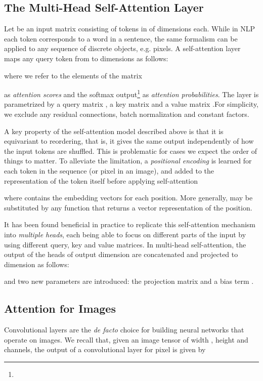 \documentclass{article} \usepackage{iclr2020_conference,times}
\begin{document}
\subsection{The Multi-Head Self-Attention Layer}
\label{ssec:background_self_attention}

Let  be an input matrix consisting of  tokens in of  dimensions each.
While in NLP each token corresponds to a word in a sentence, the same formalism can be applied to any sequence of  discrete objects, e.g. pixels. A self-attention layer maps any query token  from  to  dimensions as follows:

where we refer to the elements of the  matrix

as \textit{attention scores} and the softmax output\footnote{} as \textit{attention probabilities}.
The layer is parametrized by a query matrix , a key matrix  and a value matrix .For simplicity, we exclude any residual connections, batch normalization and constant factors.

A key property of the self-attention model described above is that it is equivariant to reordering, that is, it gives the same output independently of how the  input tokens are shuffled.
This is problematic for cases we expect the order of things to matter.
To alleviate the limitation, a \emph{positional encoding} is learned for each token in the sequence (or pixel in an image), and added to the representation of the token itself before applying self-attention

where  contains the embedding vectors for each position. More generally,  may be substituted by any function that returns a vector representation of the position.

It has been found beneficial in practice to replicate this self-attention mechanism into \emph{multiple heads}, each being able to focus on different parts of the input by using different query, key and value matrices.
In multi-head self-attention, the output of the  heads of output dimension  are concatenated and projected to dimension  as follows:

and two new parameters are introduced: the projection matrix  and a bias term .




\subsection{Attention for Images}

Convolutional layers are the \textit{de facto} choice for building neural networks that operate on images. We recall that, given an image tensor  of width , height  and  channels, the output of a convolutional layer for pixel  is given by
\end{document}
